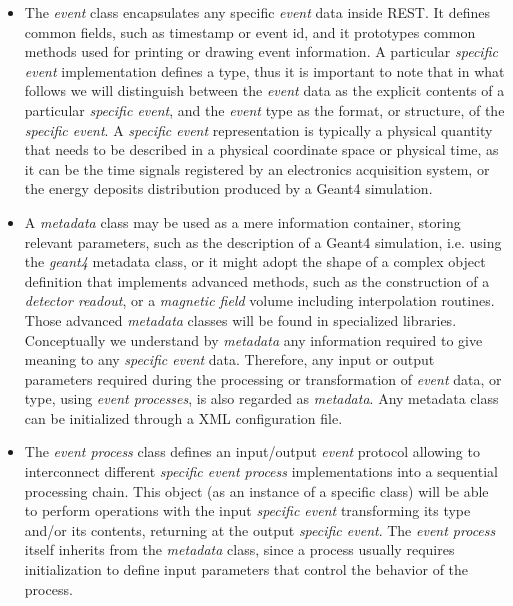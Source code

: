 \begin{itemize}
    \item The \emph{event} class encapsulates any specific \emph{event} data inside REST. It defines common fields, such as timestamp or event id, and it prototypes common methods used for printing or drawing event information. A particular \emph{specific event} implementation defines a type, thus it is important to note that in what follows we will distinguish between the \emph{event} data as the explicit contents of a particular \emph{specific event}, and the \emph{event} type as the format, or structure, of the \emph{specific event}. A \emph{specific event} representation is typically a physical quantity that needs to be described in a physical coordinate space or physical time, as it can be the time signals registered by an electronics acquisition system, or the energy deposits distribution produced by a Geant4 simulation.
    
    \item A \emph{metadata} class may be used as a mere information container, storing relevant parameters, such as the description of a Geant4 simulation, i.e. using the \emph{geant4} metadata class, or it might adopt the shape of a complex object definition that implements advanced methods, such as the construction of a \emph{detector readout}, or a \emph{magnetic field} volume including interpolation routines. Those advanced \emph{metadata} classes will be found in specialized libraries. Conceptually we understand by \emph{metadata} any information required to give meaning to any \emph{specific event} data. Therefore, any input or output parameters required during the processing or transformation of \emph{event} data, or type, using \emph{event processes}, is also regarded as \emph{metadata}. Any metadata class can be initialized through a XML configuration file.
    
    \item The \emph{event process} class defines an input/output \emph{event} protocol allowing to interconnect different \emph{specific event process} implementations into a sequential processing chain. This object (as an instance of a specific class) will be able to perform operations with the input \emph{specific event} transforming its type and/or its contents, returning at the output \emph{specific event}. The \emph{event process} itself inherits from the \emph{metadata} class, since a process usually requires initialization to define input parameters that control the behavior of the process.
\end{itemize}

